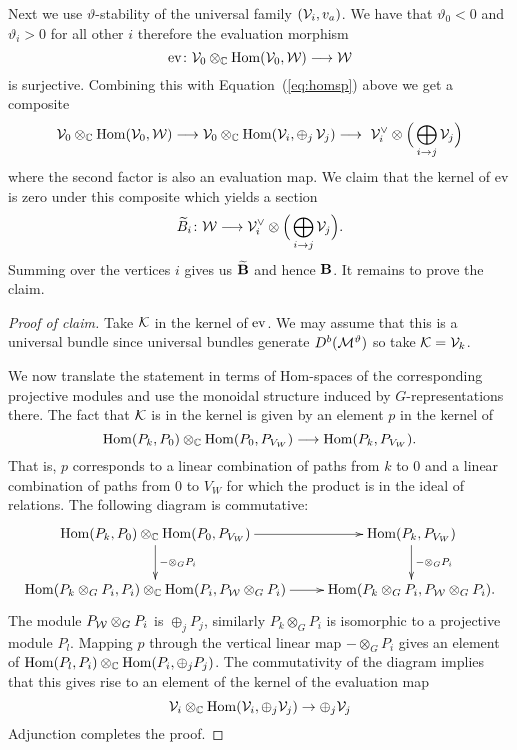 \documentclass{amsart}
\theoremstyle{definition}
\newcommand\VW{V_W}
\begin{document}
Next we use $\vartheta$-stability of the universal family $(\mathcal{V}_i, v_a)$.
We have that $\vartheta_0<0$ and $\vartheta_i>0$ for all other $i$ therefore the evaluation morphism $$\text{ev} \colon \mathcal{V}_0 \otimes_{\mathbb{C}} {\operatorname{Hom}}(\mathcal{V}_0, \mathcal{W}) \longrightarrow \mathcal{W}$$ is surjective.
Combining this with Equation~(\ref{eq:homsp}) above we get a composite
$$\mathcal{V}_0 \otimes_{\mathbb{C}} {\operatorname{Hom}}(\mathcal{V}_0, \mathcal{W}) \longrightarrow \mathcal{V}_0 \otimes_{\mathbb{C}} {\operatorname{Hom}}(\mathcal{V}_i, \oplus_j \, \mathcal{V}_j) \longrightarrow\ \mathcal{V}_i^\vee \otimes \Big(\bigoplus_{i \rightarrow j}\mathcal{V}_j\Big)$$
where the second factor is also an evaluation map.
We claim that the kernel of ev is zero under this composite which yields a section 
$$\widetilde{B}_i \colon \mathcal{W} \longrightarrow \mathcal{V}_i^\vee \otimes \Big(\bigoplus_{i \rightarrow j}\mathcal{V}_j\Big).$$
Summing over the vertices $i$ gives us $\widetilde{\mathbf{B}}$ and hence $\mathbf{B}$.
It remains to prove the claim.

\begin{proof}[Proof of claim]
Take $\mathcal{K}$ in the kernel of $\operatorname{ev}$.
We may assume that this is a universal bundle since universal bundles generate $D^b(\mathcal{M}^\vartheta)$ so take $\mathcal{K}=\mathcal{V}_k$.

We now translate the statement in terms of Hom-spaces of the corresponding projective modules and use the monoidal structure induced by $G$-representations there.
The fact that $\mathcal{K}$ is in the kernel is given by an element $p$ in the kernel of 
\begin{equation}
    \Hom(P_k, P_0) \otimes_\bC \Hom(P_0, P_{\VW}) \longrightarrow \Hom(P_k, P_{\VW}).
\end{equation}
That is, $p$ corresponds to a linear combination of paths from $k$ to $0$ and a linear combination of paths from $0$ to $\VW$ for which the product is in the ideal of relations.
The following diagram is commutative:
\begin{equation*}
    \xymatrix{\Hom(P_k, P_0) \otimes_\bC \Hom(P_0, P_{\VW}) \ar[r] \ar[d]^{- \otimes_G P_i} & \Hom(P_k, P_{\VW}) \ar[d]^{- \otimes_G P_i} \\
    \Hom(P_k \otimes_G P_i, P_i) \otimes_\bC \Hom(P_i, P_\cW \otimes_G P_i) \ar[r] & \Hom(P_k \otimes_G P_i, P_\cW \otimes_G P_i).}
\end{equation*}
The module $P_{\mathcal{W}} \otimes_G P_i$ is $\oplus_j P_j$, similarly $P_k \otimes_G P_i$ is isomorphic to a projective module $P_l$. 
Mapping $p$ through the vertical linear map $- \otimes_G P_i$ gives an element of $\operatorname{Hom}(P_l, P_i) \otimes_{\mathbb{C}} \operatorname{Hom}(P_i, \oplus_j P_j)$.
The commutativity of the diagram implies that this gives rise to an element of the kernel of the evaluation map $$\mathcal{V}_i \otimes_{\mathbb{C}} \operatorname{Hom}(\mathcal{V}_i, \oplus_j \mathcal{V}_j) \rightarrow \oplus_j \mathcal{V}_j$$
Adjunction completes the proof.
\end{proof}
\end{document}
